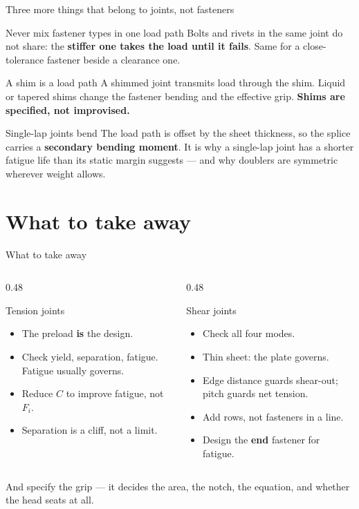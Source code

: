 \documentclass[aspectratio=169,10pt]{beamer}
\begin{document}
\begin{frame}{Three more things that belong to joints, not fasteners}
\begin{alertblock}{Never mix fastener types in one load path}
Bolts and rivets in the same joint do not share: the \textbf{stiffer one takes the load until it
fails}. Same for a close-tolerance fastener beside a clearance one.
\end{alertblock}
\begin{alertblock}{A shim is a load path}
A shimmed joint transmits load through the shim. Liquid or tapered shims change the fastener bending
and the effective grip. \textbf{Shims are specified, not improvised.}
\end{alertblock}
\begin{alertblock}{Single-lap joints bend}
The load path is offset by the sheet thickness, so the splice carries a \textbf{secondary bending
moment}. It is why a single-lap joint has a shorter fatigue life than its static margin suggests ---
and why doublers are symmetric wherever weight allows.
\end{alertblock}
\end{frame}

\section{What to take away}

\begin{frame}{What to take away}
\begin{columns}[T]
\begin{column}{0.48\textwidth}
\begin{block}{Tension joints}
\begin{itemize}\footnotesize
\item The preload \textbf{is} the design.
\item Check yield, separation, fatigue. Fatigue usually governs.
\item \alert{Reduce $C$ to improve fatigue, not $F_i$.}
\item Separation is a cliff, not a limit.
\end{itemize}
\end{block}
\end{column}
\begin{column}{0.48\textwidth}
\begin{block}{Shear joints}
\begin{itemize}\footnotesize
\item Check all four modes.
\item Thin sheet: the plate governs.
\item Edge distance guards shear-out; pitch guards net tension.
\item \alert{Add rows, not fasteners in a line.}
\item Design the \textbf{end} fastener for fatigue.
\end{itemize}
\end{block}
\end{column}
\end{columns}
\vfill
\centering
\large And specify the grip --- it decides the area, the notch, the equation, and whether the head
seats at all.
\end{frame}
\end{document}
